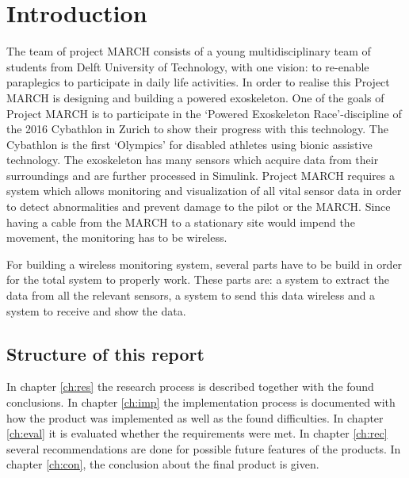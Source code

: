 \chapter{Introduction}
The team of project MARCH consists of a young multidisciplinary team of students from Delft University of Technology, with one vision: to re-enable paraplegics to participate in daily life activities. In order to realise this Project MARCH is designing and building a
powered exoskeleton. One of the goals of Project MARCH is to participate in the ‘Powered Exoskeleton Race’-discipline
of the 2016 Cybathlon in Zurich to show their progress with this technology. The Cybathlon is the first ‘Olympics’ for disabled athletes
using bionic assistive technology. 
The exoskeleton has many sensors which acquire data from their surroundings and are further processed in Simulink. Project MARCH requires a system which allows monitoring and visualization of all vital sensor data in order to detect abnormalities and prevent damage to the pilot or the MARCH. Since having a cable from the MARCH to a stationary site would impend the movement, the monitoring has to be wireless. 		

For building a wireless monitoring system, several parts have to be build in order for the total system to properly work. These parts are: a system to extract the data from all the relevant sensors, a system to send this data wireless and a system to receive and show the data.
\section{Structure of this report}
In chapter \ref{ch:res} the research process is described together with the found conclusions. In chapter \ref{ch:imp} the implementation process is documented with how the product was implemented as well as the found difficulties. In chapter \ref{ch:eval} it is evaluated whether the requirements were met. In chapter \ref{ch:rec} several recommendations are done for possible future features of the products.  In chapter \ref{ch:con}, the conclusion about the final product is given.
